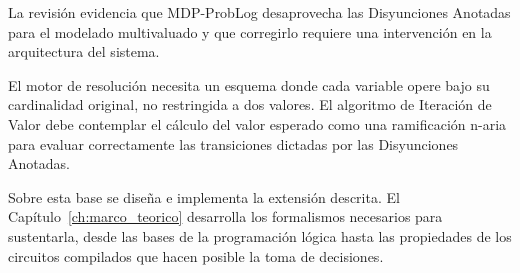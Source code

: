 La revisión evidencia que MDP-ProbLog desaprovecha las Disyunciones Anotadas para el modelado multivaluado y que corregirlo requiere una intervención en la arquitectura del sistema.

El motor de resolución necesita un esquema donde cada variable opere bajo su cardinalidad original, no restringida a dos valores. El algoritmo de Iteración de Valor debe contemplar el cálculo del valor esperado como una ramificación n-aria para evaluar correctamente las transiciones dictadas por las Disyunciones Anotadas.

Sobre esta base se diseña e implementa la extensión descrita. El Capítulo~\ref{ch:marco_teorico} desarrolla los formalismos necesarios para sustentarla, desde las bases de la programación lógica hasta las propiedades de los circuitos compilados que hacen posible la toma de decisiones.
